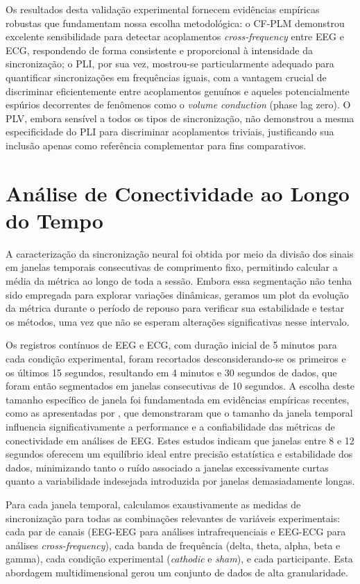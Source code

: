 Os resultados desta validação experimental fornecem evidências empíricas robustas que fundamentam nossa escolha metodológica: o CF-PLM demonstrou excelente sensibilidade para detectar acoplamentos \textit{cross-frequency} entre EEG e ECG, respondendo de forma consistente e proporcional à intensidade da sincronização; o PLI, por sua vez, mostrou-se particularmente adequado para quantificar sincronizações em frequências iguais, com a vantagem crucial de discriminar eficientemente entre acoplamentos genuínos e aqueles potencialmente espúrios decorrentes de fenômenos como o \textit{volume conduction} (phase lag zero). O PLV, embora sensível a todos os tipos de sincronização, não demonstrou a mesma especificidade do PLI para discriminar acoplamentos triviais, justificando sua inclusão apenas como referência complementar para fins comparativos.

\section{Análise de Conectividade ao Longo do Tempo}
\label{sec:connectivity_over_time}
A caracterização da sincronização neural foi obtida por meio da divisão dos sinais em janelas temporais consecutivas de comprimento fixo, permitindo calcular a média da métrica ao longo de toda a sessão. Embora essa segmentação não tenha sido empregada para explorar variações dinâmicas, geramos um plot da evolução da métrica durante o período de repouso para verificar sua estabilidade e testar os métodos, uma vez que não se esperam alterações significativas nesse intervalo.

Os registros contínuos de EEG e ECG, com duração inicial de 5 minutos para cada condição experimental, foram recortados desconsiderando-se os primeiros e os últimos 15 segundos, resultando em 4 minutos e 30 segundos de dados, que foram então segmentados em janelas consecutivas de 10 segundos. A escolha deste tamanho específico de janela foi fundamentada em evidências empíricas recentes, como as apresentadas por , que demonstraram que o tamanho da janela temporal influencia significativamente a performance e a confiabilidade das métricas de conectividade em análises de EEG. Estes estudos indicam que janelas entre 8 e 12 segundos oferecem um equilíbrio ideal entre precisão estatística e estabilidade dos dados, minimizando tanto o ruído associado a janelas excessivamente curtas quanto a variabilidade indesejada introduzida por janelas demasiadamente longas.

Para cada janela temporal, calculamos exaustivamente as medidas de sincronização para todas as combinações relevantes de variáveis experimentais: cada par de canais (EEG-EEG para análises intrafrequenciais e EEG-ECG para análises \textit{cross-frequency}), cada banda de frequência (delta, theta, alpha, beta e gamma), cada condição experimental (\textit{cathodic} e \textit{sham}), e cada participante. Esta abordagem multidimensional gerou um conjunto de dados de alta granularidade.


